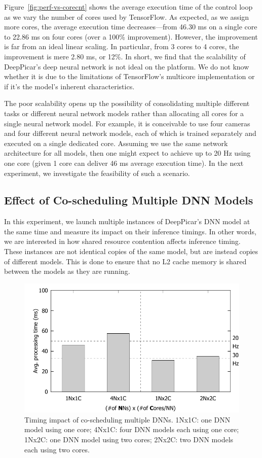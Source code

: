 Figure~\ref{fig:perf-vs-corecnt} shows the average execution time of
the control loop as we vary the number of cores used by
TensorFlow. As expected, as we assign more cores, the average execution
time decreases---from 46.30 ms on a single core to 22.86 ms on four
cores (over a 100\% improvement). However, the improvement is far from an ideal
linear scaling. In particular, from 3 cores to 4 cores, the
improvement is mere 2.80 ms, or 12\%. In short, we find that the
scalability of DeepPicar's deep neural network is not ideal on the
platform. We do not know whether it is due to the limitations of
TensorFlow's multicore implementation or if it's the model's inherent
characteristics. 

The poor scalability opens up the possibility of consolidating
multiple different tasks or different neural network models rather
than allocating all cores for a single neural network model. For
example, it is conceivable to use four cameras and four different
neural network models, each of which is trained separately and
executed on a single dedicated core. Assuming we use the same network
architecture for all models, then one might expect to achieve up to
20 Hz using one core (given 1 core can deliver 46 ms average
execution time). In the next experiment, we investigate the
feasibility of such a scenario.

\subsection{Effect of Co-scheduling Multiple DNN Models}

In this experiment, we launch multiple instances of DeepPicar's DNN
model at the same time and measure its impact on their inference
timings. In other words, we are interested in how shared resource
contention affects inference timing. These instances are not identical
copies of the same model, but are instead copies of different models. 
This is done to ensure that no L2 cache memory is shared between the 
models as they are running.

\begin{figure}[h]
  \centering
  \includegraphics[width=.7\textwidth]{figs/perf_vs_modelcnt}
  \caption{Timing impact of co-scheduling multiple DNNs. 1Nx1C: one DNN
    model using one core; 4Nx1C: four DNN models each using one core;
    1Nx2C: one DNN model using two cores; 2Nx2C: two DNN models each
    using two cores.} 
  \label{fig:perf-vs-modelcnt}
\end{figure}

